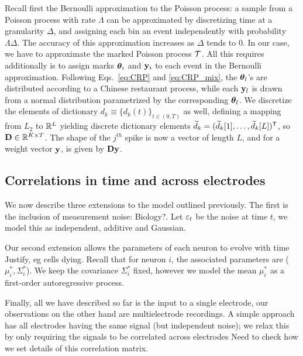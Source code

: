 Recall first the Bernoulli approximation to the Poisson process: a sample from a Poisson process with rate $\Lambda$ can be approximated by discretizing
time at a granularity $\Delta$, and assigning each bin an event independently with probability $\Lambda\Delta$. The accuracy of this approximation increases 
as $\Delta$ tends to $0$.
%
In our case, we have to approximate the marked Poisson process $\mathcal{T}$. All this requires additionally is to assign marks $\boldsymbol{\theta}_i$ and $\mathbf{y}_i$ to each event 
in the Bernoulli approximation. Following Eqs.~\eqref{eq:CRP} and \eqref{eq:CRP_mix}, the $\boldsymbol{\theta}_l$'s are distributed according
to a Chinese restaurant process, while each $\mathbf{y}_l$ is drawn from a normal distribution parametrized by the corresponding $\boldsymbol{\theta}_l$. We discretize the 
elements of dictionary $d_k \equiv \{d_k(t)\}_{t \in (0,T)}$ as well, defining a mapping from $L_2$ to $\mathbb{R}^L$ yielding discrete dictionary elements $\widetilde{d}_k=(\widetilde{d}_k[1], \ldots, \widetilde{d}_k[L])^{\mathsf{T}}$,  so  $\mathbf{D} \in \mathbb{R}^{K \times T}$. The shape of the $j^{th}$ spike is now a vector of length $L$, and for a weight vector
$\mathbf{y}$, is given by $\mathbf{D} \mathbf{y}$.

\subsection{Correlations in time and across electrodes}
We now describe three extensions to the model outlined previously. The first is the inclusion of measurement noise: 
{\color{red} Biology?}. Let $\varepsilon_t$ be the noise at time $t$, we model this as independent, additive and Gaussian.

Our second extension allows the parameters of each neuron to evolve with time {\color{red} Justify, eg cells dying}. Recall that for neuron $i$, the 
associated parameters are ($\mu^*_i, \Sigma^*_i$). We keep the covariance $\Sigma^*_i$ fixed, however we model the mean $\mu^*_i$ as a first-order
autoregressive process. 

Finally, all we have described so far is the input to a single electrode, our observations on the other hand are multielectrode recordings. 
A simple approach has all electrodes having the same signal (but independent noise); we relax this by only requiring the signals to be
correlated across electrodes {\color{red} Need to check how we set details of this correlation matrix}.
